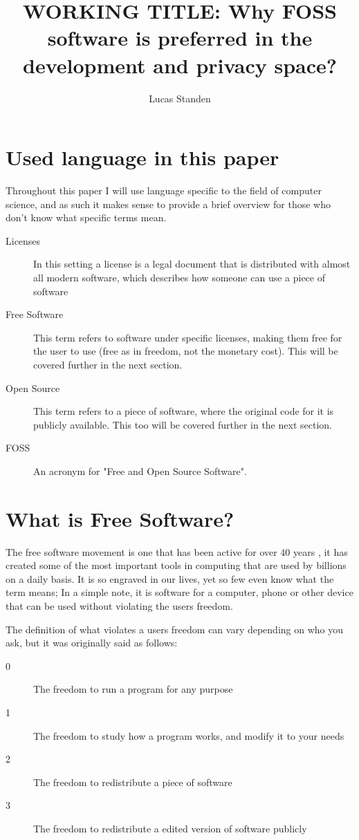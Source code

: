 \documentclass[a4paper,12pt]{article}
\author{Lucas Standen}
\title{WORKING TITLE: Why FOSS software is preferred in the 
development and privacy space?}
\begin{document}
\maketitle

\newpage
\tableofcontents
\newpage

{\setlength{\parindent}{0cm}

\section{Used language in this paper}
Throughout this paper I will use language specific to the field of computer science, and as such
it makes sense to provide a brief overview for those who don't know what specific terms mean.
\begin{description}
	\item[Licenses] In this setting a license is a legal document that is distributed with
		almost all modern software, which describes how someone can use a piece of software
	\item[Free Software] This term refers to software under specific licenses, making them 
		free for the user to use (free as in freedom, not the monetary cost). This will
		be covered further in the next section.
	\item[Open Source] This term refers to a piece of software, where the original code for it
		is publicly available. This too will be covered further in the next section.
	\item[FOSS] An acronym for "Free and Open Source Software".
\end{description}

\section{What is Free Software?}
The free software movement is one that has been active for over 40 years \cite{GNUmaifesto}, it has
created some of the most important tools in computing that are used by billions on a daily basis. 
It is so engraved in our lives, yet so few even know what the term means; In a simple note, it is
software for a computer, phone or other device that can be used without violating the users 
freedom.

The definition of what violates a users freedom can vary depending on who you ask, but it was
originally said as follows:
\begin{description}
	\item[0] The freedom to run a program for any purpose
	\item[1] The freedom to study how a program works, and modify it to your needs
	\item[2] The freedom to redistribute a piece of software
	\item[3] The freedom to redistribute a edited version of software publicly
\end{description}
\cite{FREESOFTWAREDEFINTION}
}
\end{document}
